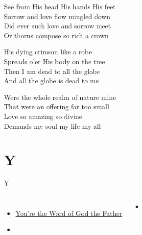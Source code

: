 \documentclass[aspectratio=169]{beamer}
\begin{document}
{\begin{frame}{}
\end{frame}
\hypertarget{When I survey the wondrous cross[](Watts)3}{}
\begin{frame}{}
\fontsize{23.68421052631579}{28.42105263157895}\selectfont

See from His head His hands His feet\\ 
Sorrow and love flow mingled down\\ 
Did ever such love and sorrow meet\\ 
Or thorns compose so rich a crown

\end{frame}
\hypertarget{When I survey the wondrous cross[](Watts)(4)}{}
\begin{frame}{}
\fontsize{23.68421052631579}{28.42105263157895}\selectfont

His dying crimson like a robe\\ 
Spreads o'er His body on the tree\\ 
Then I am dead to all the globe\\ 
And all the globe is dead to me

\end{frame}
\hypertarget{When I survey the wondrous cross[](Watts)5}{}
\begin{frame}{}
\fontsize{23.68421052631579}{28.42105263157895}\selectfont

Were the whole realm of nature mine\\ 
That were an offering far too small\\ 
Love so amazing so divine\\ 
Demands my soul my life my all

\end{frame}
}

\section{ Y }

\begin{frame}[t]{Y}
\begin{columns}[t]
\begin{itemize}
    \item \hyperlink{Across the lands["You're the Word of God the Father"](Townend)}{You're the Word of God the Father}
    \item[] \phantom{1}
\end{itemize}
\begin{itemize}
    \item[] \phantom{1}
\end{itemize}
\end{columns}
\end{frame}
\end{document}
